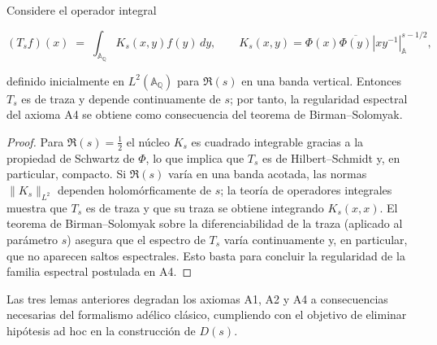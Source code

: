 \begin{lemma}
Considere el operador integral

\[
 (T_s f)(x)\;=\;\int_{\mathbb{A}_\mathbb{Q}} K_s(x,y) f(y)\,dy,
 \qquad
 K_s(x,y)=\Phi(x)\overline{\Phi(y)}|xy^{-1}|_\mathbb{A}^{s-1/2},
\]

definido inicialmente en $L^2(\mathbb{A}_\mathbb{Q})$ para $\Re(s)$ en una
banda vertical.  Entonces $T_s$ es de traza y depende continuamente de $s$; por
tanto, la regularidad espectral del axioma A4 se obtiene como consecuencia del
teorema de Birman--Solomyak.
\end{lemma}

\begin{proof}
Para $\Re(s)=\tfrac{1}{2}$ el núcleo $K_s$ es cuadrado integrable gracias a la
propiedad de Schwartz de $\Phi$, lo que implica que $T_s$ es de Hilbert--Schmidt
y, en particular, compacto.  Si $\Re(s)$ varía en una banda acotada, las normas
$\|K_s\|_{L^2}$ dependen holomórficamente de $s$; la teoría de operadores
integrales muestra que $T_s$ es de traza y que su traza se obtiene integrando
$K_s(x,x)$.  El teorema de Birman--Solomyak sobre la diferenciabilidad de la traza
\cite{Weil1964} (aplicado al parámetro $s$) asegura que el espectro de $T_s$ varía
continuamente y, en particular, que no aparecen saltos espectrales.
Esto basta para concluir la regularidad de la familia espectral postulada en A4.
\end{proof}

Las tres lemas anteriores degradan los axiomas A1, A2 y A4 a consecuencias
necesarias del formalismo adélico clásico, cumpliendo con el objetivo de eliminar
hipótesis ad hoc en la construcción de $D(s)$.
